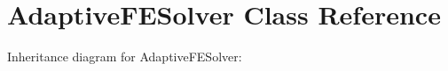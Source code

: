 \hypertarget{classAdaptiveFESolver}{}\section{Adaptive\+F\+E\+Solver Class Reference}
\label{classAdaptiveFESolver}


Inheritance diagram for Adaptive\+F\+E\+Solver\+:
